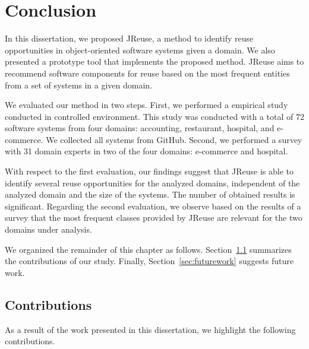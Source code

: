 \chapter{Conclusion}
\label{ch:conclusion}

In this dissertation, we proposed JReuse, a method to identify reuse opportunities in object-oriented software systems given a domain. We also presented a prototype tool that implements the proposed method. JReuse aims to recommend software components for reuse based on the most frequent entities from a set of systems in a given domain. 

We evaluated our method in two steps. First, we performed a empirical study conducted in controlled environment. This study was conducted with a total of 72 software systems from four domains: accounting, restaurant, hospital, and e-commerce. We collected all systems from GitHub. Second, we performed a survey  with 31 domain experts in two of the four domains: e-commerce and hospital. 

With respect to the first evaluation, our findings suggest that JReuse is able to identify several reuse opportunities for the analyzed domains, independent of the analyzed domain and the size of the systems. The number of obtained results is significant. Regarding the second evaluation, we observe based on the results of a survey that the most frequent classes provided by JReuse are relevant for the two domains under analysis.

We organized the remainder of this chapter as follows. Section~\ref{secFim:contributions} summarizes the contributions of our study. Finally, Section~\ref{sec:futurework} suggests future work.

\section{Contributions}
\label{secFim:contributions}
As a result of the work presented in this dissertation, we highlight the following contributions.\\

